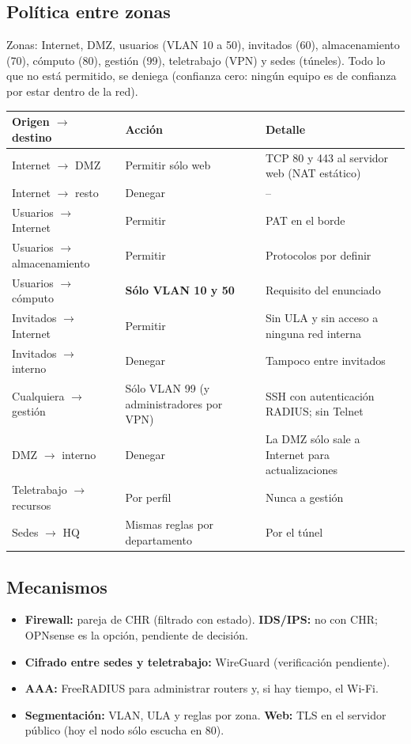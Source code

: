 \documentclass[11pt,a4paper]{article}
\begin{document}
\subsection{Política entre zonas}
Zonas: Internet, DMZ, usuarios (VLAN 10 a 50), invitados (60), almacenamiento (70), cómputo (80), gestión (99), teletrabajo (VPN) y sedes (túneles). Todo lo que no está permitido, se deniega (confianza cero: ningún equipo es de confianza por estar dentro de la red).
\begingroup\footnotesize
\begin{longtable}{@{}p{4.2cm}p{4.6cm}p{7.7cm}@{}}
\toprule
\textbf{Origen $\rightarrow$ destino} & \textbf{Acción} & \textbf{Detalle}\\
\midrule
\endhead
Internet $\rightarrow$ DMZ & Permitir sólo web & TCP 80 y 443 al servidor web (NAT estático)\\
Internet $\rightarrow$ resto & Denegar & --\\
Usuarios $\rightarrow$ Internet & Permitir & PAT en el borde\\
Usuarios $\rightarrow$ almacenamiento & Permitir & Protocolos por definir\\
Usuarios $\rightarrow$ cómputo & \textbf{Sólo VLAN 10 y 50} & Requisito del enunciado\\
Invitados $\rightarrow$ Internet & Permitir & Sin ULA y sin acceso a ninguna red interna\\
Invitados $\rightarrow$ interno & Denegar & Tampoco entre invitados\\
Cualquiera $\rightarrow$ gestión & Sólo VLAN 99 (y administradores por VPN) & SSH con autenticación RADIUS; sin Telnet\\
DMZ $\rightarrow$ interno & Denegar & La DMZ sólo sale a Internet para actualizaciones\\
Teletrabajo $\rightarrow$ recursos & Por perfil & Nunca a gestión\\
Sedes $\rightarrow$ HQ & Mismas reglas por departamento & Por el túnel\\
\bottomrule
\end{longtable}
\endgroup

\subsection{Mecanismos}
\begin{itemize}
\item \textbf{Firewall:} pareja de CHR (filtrado con estado). \textbf{IDS/IPS:} no con CHR; OPNsense es la opción, pendiente de decisión.
\item \textbf{Cifrado entre sedes y teletrabajo:} WireGuard (verificación pendiente).
\item \textbf{AAA:} FreeRADIUS para administrar routers y, si hay tiempo, el Wi-Fi.
\item \textbf{Segmentación:} VLAN, ULA y reglas por zona. \textbf{Web:} TLS en el servidor público (hoy el nodo sólo escucha en 80).
\end{itemize}
\end{document}
